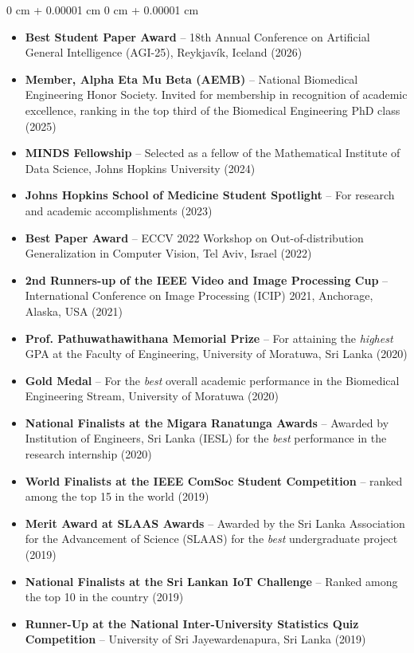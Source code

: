 \documentclass[10pt, letterpaper]{article}
\newenvironment{highlights}{
    \begin{itemize}[
        topsep=0.10 cm,
        parsep=0.10 cm,
        partopsep=0pt,
        itemsep=0pt,
        leftmargin=0 cm + 10pt
    ]
}{
    \end{itemize}
} %
\newenvironment{onecolentry}{
    \begin{adjustwidth}{
        0 cm + 0.00001 cm
    }{
        0 cm + 0.00001 cm
    }
}{
    \end{adjustwidth}
} %
\begin{document}
    \begin{onecolentry}
        \begin{highlights}  
            \item \textbf{Best Student Paper Award} -- 18th Annual Conference on Artificial General Intelligence (AGI-25), Reykjavík, Iceland (2026)
            \item \textbf{Member, Alpha Eta Mu Beta (AEMB)} -- National Biomedical Engineering Honor Society. Invited for membership in recognition of academic excellence, ranking in the top third of the Biomedical Engineering PhD class (2025)
            \item \textbf{MINDS Fellowship} -- Selected as a fellow of the Mathematical Institute of Data Science, Johns Hopkins University (2024)
            \item \textbf{Johns Hopkins School of Medicine Student Spotlight} -- For research and academic accomplishments (2023)
            \item \textbf{Best Paper Award} -- ECCV 2022 Workshop on Out-of-distribution Generalization in Computer Vision, Tel Aviv, Israel (2022)
            \item \textbf{2nd Runners-up of the IEEE Video and Image Processing Cup} -- International Conference on Image Processing (ICIP) 2021, Anchorage, Alaska, USA (2021)
            \item \textbf{Prof. Pathuwathawithana Memorial Prize} -- For attaining the \emph{highest} GPA at the Faculty of Engineering, University of Moratuwa, Sri Lanka (2020)
            \item \textbf{Gold Medal} -- For the \emph{best} overall academic performance in the Biomedical Engineering Stream, University of Moratuwa (2020)
            \item \textbf{National Finalists at the Migara Ranatunga Awards} -- Awarded by Institution of Engineers, Sri Lanka (IESL) for the \emph{best} performance in the research internship (2020)
            \item \textbf{World Finalists at the IEEE ComSoc Student Competition} -- ranked among the top 15 in the world (2019)
            \item \textbf{Merit Award at SLAAS Awards} -- Awarded by the Sri Lanka Association for the Advancement of Science (SLAAS) for the \emph{best} undergraduate project (2019)
            \item \textbf{National Finalists at the Sri Lankan IoT Challenge} -- Ranked among the top 10 in the country (2019)
            \item \textbf{Runner-Up at the National Inter-University Statistics Quiz Competition} -- University of Sri Jayewardenapura, Sri Lanka (2019)

\end{highlights}
\end{onecolentry}
\end{document}
